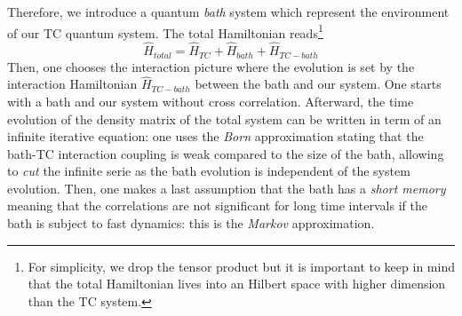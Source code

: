 \documentclass[11pt]{report}
\begin{document}
Therefore, we introduce a quantum \textit{bath} system which represent the environment of our TC quantum system. The total Hamiltonian reads\footnote{For simplicity, we drop the tensor product but it is important to keep in mind that the total Hamiltonian lives into an Hilbert space with higher dimension than the TC system.}
\begin{equation}
\hat{H}_{total} = \hat{H}_{TC} + \hat{H}_{bath} + \hat{H}_{TC-bath}
\end{equation}
Then, one chooses the interaction picture where the evolution is set by the interaction Hamiltonian $\hat{H}_{TC-bath}$ between the bath and our system. One starts with a bath and our system without cross correlation. Afterward, the time evolution of the density matrix of the total system can be written in term of an infinite iterative equation: one uses the \textit{Born} approximation stating that the bath-TC interaction coupling is weak compared to the size of the bath, allowing to \textit{cut} the infinite serie as the bath evolution is independent of the system evolution. Then, one makes a last assumption that the bath has a \textit{short memory} meaning that the correlations are not significant for long time intervals if the bath is subject to fast dynamics: this is the \textit{Markov} approximation.
\end{document}
